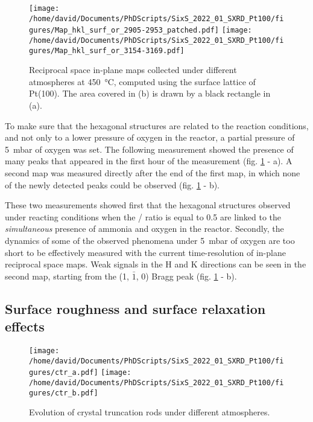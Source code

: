 \begin{figure}[!htb]
    \centering
    \texttt{[image: /home/david/Documents/PhDScripts/SixS\_2022\_01\_SXRD\_Pt100/figures/Map\_hkl\_surf\_or\_2905-2953\_patched.pdf]}
    \texttt{[image: /home/david/Documents/PhDScripts/SixS\_2022\_01\_SXRD\_Pt100/figures/Map\_hkl\_surf\_or\_3154-3169.pdf]}
    \caption{
        Reciprocal space in-plane maps collected under different atmospheres at \qty{450}{\degreeCelsius}, computed using the surface lattice of Pt(100).
        The area covered in (b) is drawn by a black rectangle in (a).
    }
    \label{fig:MapsPt100D}
\end{figure}

To make sure that the hexagonal structures are related to the reaction conditions, and not only to a lower pressure of oxygen in the reactor, a partial pressure of \qty{5}{\milli\bar} of oxygen was set.
The following measurement showed the presence of many peaks that appeared in the first hour of the measurement (fig. \ref{fig:MapsPt100D} - a).
A second map was measured directly after the end of the first map, in which none of the newly detected peaks could be observed (fig. \ref{fig:MapsPt100D} - b).

These two measurements showed first that the hexagonal structures observed under reacting conditions when the / ratio is equal to \num{0.5} are linked to the \textit{simultaneous} presence of ammonia and oxygen in the reactor.
Secondly, the dynamics of some of the observed phenomena under \qty{5}{\milli\bar} of oxygen are too short to be effectively measured with the current time-resolution of in-plane reciprocal space maps.
Weak signals in the H and K directions can be seen in the second map, starting from the (1, $\bar{1}$, 0) Bragg peak (fig. \ref{fig:MapsPt100D} - b).

\subsection{Surface roughness and surface relaxation effects}

\begin{figure}[!htb]
    \centering
    \texttt{[image: /home/david/Documents/PhDScripts/SixS\_2022\_01\_SXRD\_Pt100/figures/ctr\_a.pdf]}
    \texttt{[image: /home/david/Documents/PhDScripts/SixS\_2022\_01\_SXRD\_Pt100/figures/ctr\_b.pdf]}
    \caption{
        Evolution of crystal truncation rods under different atmospheres.
    }
    \label{fig:CTRPt100}
\end{figure}

